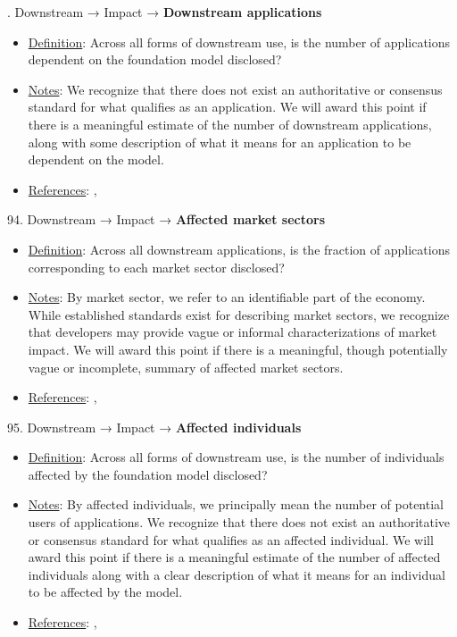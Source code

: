 . Downstream → Impact → \textbf{Downstream applications}
\vspace{-\parskip}
\begin{itemize}
	\item
	\underline{Definition}: Across all forms of downstream use, is the number of applications dependent on the foundation model disclosed?
	\item
	\underline{Notes}: We recognize that there does not exist an authoritative or consensus standard for what qualifies as an application. We will award this point if there is a meaningful estimate of the number of downstream applications, along with some description of what it means for an application to be dependent on the model.
	\item
	\underline{References}: \citet{vipra2023concentration}, \citet{bommasani2023ecosystem}
\end{itemize} \vspace{\baselineskip}


94. Downstream → Impact → \textbf{Affected market sectors}
\vspace{-\parskip}
\begin{itemize}
	\item
	\underline{Definition}: Across all downstream applications, is the fraction of applications corresponding to each market sector disclosed?
	\item
	\underline{Notes}: By market sector, we refer to an identifiable part of the economy. While established standards exist for describing market sectors, we recognize that developers may provide vague or informal characterizations of market impact. We will award this point if there is a meaningful, though potentially vague or incomplete, summary of affected market sectors.
	\item
	\underline{References}: \citet{vipra2023concentration}, \citet{bommasani2023ecosystem}
\end{itemize} \vspace{\baselineskip}


95. Downstream → Impact → \textbf{Affected individuals}
\vspace{-\parskip}
\begin{itemize}
	\item
	\underline{Definition}: Across all forms of downstream use, is the number of individuals affected by the foundation model disclosed?
	\item
	\underline{Notes}: By affected individuals, we principally mean the number of potential users of applications. We recognize that there does not exist an authoritative or consensus standard for what qualifies as an affected individual. We will award this point if there is a meaningful estimate of the number of affected individuals along with a clear description of what it means for an individual to be affected by the model.
	\item
	\underline{References}: \citet{vipra2023concentration}, \citet{bommasani2023ecosystem}
\end{itemize} \vspace{\baselineskip}



